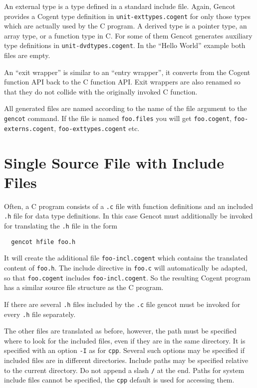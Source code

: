 \documentclass[a4paper]{report}
\newcommand{\code}[1]{\textnormal{\texttt{#1}}}
\begin{document}
An external type is a type defined in a standard include file. Again, Gencot provides a Cogent type definition in 
\code{unit-exttypes.cogent} for only those 
types which are actually used by the C program. A derived type is a pointer type, an array type, or a function type in C. For 
some of them Gencot generates auxiliary type definitions in \code{unit-dvdtypes.cogent}. In the ``Hello World'' example 
both files are empty.

An ``exit wrapper'' is similar to an ``entry wrapper'', it converts from the Cogent function API back to the C function API.
Exit wrappers are also renamed so that they do not collide with the originally invoked C function.

All generated files are named according to the name of the file argument to the \code{gencot} command. If the file is named 
\code{foo.files} you will get \code{foo.cogent}, \code{foo-externs.cogent}, \code{foo-exttypes.cogent} etc.

\section{Single Source File with Include Files}
\label{simple-include}

Often, a C program consists of a \code{.c} file with function definitions and an included \code{.h} file for data type 
definitions. In this case Gencot must additionally be invoked for translating the \code{.h} file in the form
\begin{verbatim}
  gencot hfile foo.h
\end{verbatim}
It will create the additional file \code{foo-incl.cogent} which contains the translated content of \code{foo.h}. The 
include directive in \code{foo.c} will automatically be adapted, so that \code{foo.cogent} includes \code{foo-incl.cogent}.
So the resulting Cogent program has a similar source file structure as the C program.

If there are several \code{.h} files included by the \code{.c} file gencot must be invoked for every \code{.h} file
separately.

The other files are translated as before, however, the path must be specified where to look for the included files, even
if they are in the same directory. It is specified with an option \code{-I} as for \code{cpp}. Several such options may 
be specified if included files are in different directories. Include paths may be specified relative to the current 
directory. Do not append a slash \code{/} at the end. Paths for system include files cannot be specified, the \code{cpp} 
default is used for accessing them.
\end{document}
